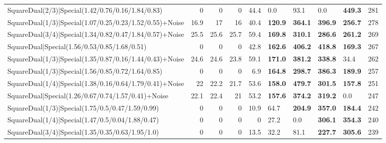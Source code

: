 \begin{tabular}{lrrrrllllr}
 SquareDual(2/3)|Special(1.42/0.76/0.16/1.84/0.83)       &          0   &          0   &          0   &            44.4 & 0.0            & 93.1           & 0.0            & \textbf{449.3}  &          281 \\
 SquareDual(1/3)|Special(1.07/0.25/0.23/1.52/0.55)+Noise &         16.9 &         17   &         16   &            40.4 & \textbf{120.9} & \textbf{364.1} & \textbf{396.9} & \textbf{256.7}  &          278 \\
 SquareDual(3/4)|Special(1.34/0.82/0.47/1.84/0.57)+Noise &         25.5 &         25.6 &         25.7 &            59.4 & \textbf{169.8} & \textbf{310.1} & \textbf{286.6} & \textbf{261.2}  &          269 \\
 SquareDual|Special(1.56/0.53/0.85/1.68/0.51)            &          0   &          0   &          0   &            42.8 & \textbf{162.6} & \textbf{406.2} & \textbf{418.8} & \textbf{169.3}  &          267 \\
 SquareDual(1/3)|Special(1.35/0.87/0.16/1.44/0.43)+Noise &         24.6 &         24.6 &         23.8 &            59.1 & \textbf{171.0} & \textbf{381.2} & \textbf{338.8} & 34.4            &          262 \\
 SquareDual(1/3)|Special(1.56/0.85/0.72/1.64/0.85)       &          0   &          0   &          0   &             6.9 & \textbf{164.8} & \textbf{298.7} & \textbf{386.3} & \textbf{189.9}  &          257 \\
 SquareDual(1/4)|Special(1.38/0.16/0.64/1.79/0.41)+Noise &         22   &         22.2 &         21.7 &            53.6 & \textbf{158.0} & \textbf{479.7} & \textbf{301.5} & \textbf{157.8}  &          251 \\
 SquareDual|Special(1.26/0.67/0.74/1.57/0.41)+Noise      &         22.1 &         22.4 &         21   &            53.2 & \textbf{157.6} & \textbf{374.2} & \textbf{319.2} & 0.0             &          247 \\
 SquareDual(1/3)|Special(1.75/0.5/0.47/1.59/0.99)        &          0   &          0   &          0   &            10.9 & 64.7           & \textbf{204.9} & \textbf{357.0} & \textbf{184.4}  &          242 \\
 SquareDual(1/4)|Special(1.47/0.5/0.04/1.88/0.47)        &          0   &          0   &          0   &             0   & 27.2           & 0.0            & \textbf{306.1} & \textbf{354.3}  &          240 \\
 SquareDual(3/4)|Special(1.35/0.35/0.63/1.95/1.0)        &          0   &          0   &          0   &            13.5 & 32.2           & 81.1           & \textbf{227.7} & \textbf{305.6}  &          239 \\

\end{tabular}
